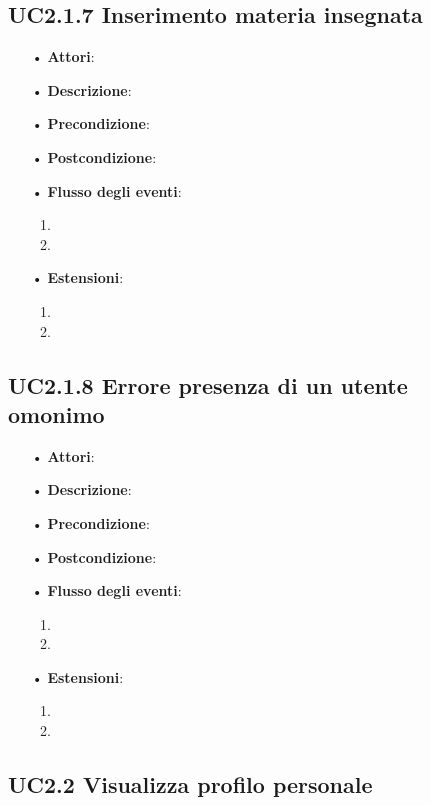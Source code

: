 \subsection{UC2.1.7 Inserimento materia insegnata}
\begin{itemize}
	\item[•] \textbf{Attori}: 
	\item[•] \textbf{Descrizione}:
	\item[•] \textbf{Precondizione}:
	\item[•] \textbf{Postcondizione}:
	\item[•] \textbf{Flusso degli eventi}:
		\begin{enumerate}
			\item
			\item
		\end{enumerate}
	\item[•] \textbf{Estensioni}:
		\begin{enumerate}
			\item
			\item
		\end{enumerate}
\end{itemize}

\subsection{UC2.1.8 Errore presenza di un utente omonimo}
\begin{itemize}
	\item[•] \textbf{Attori}: 
	\item[•] \textbf{Descrizione}:
	\item[•] \textbf{Precondizione}:
	\item[•] \textbf{Postcondizione}:
	\item[•] \textbf{Flusso degli eventi}:
		\begin{enumerate}
			\item
			\item
		\end{enumerate}
	\item[•] \textbf{Estensioni}:
		\begin{enumerate}
			\item
			\item
		\end{enumerate}
\end{itemize}

\subsection{UC2.2 Visualizza profilo personale}

